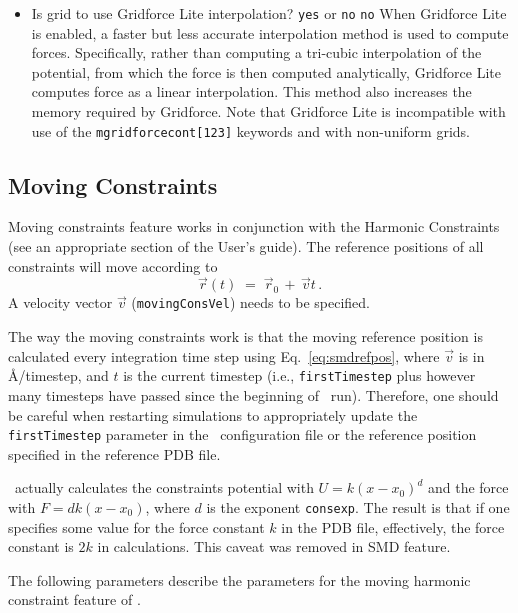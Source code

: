 \begin{itemize}
\item
{}
{Is grid to use Gridforce Lite interpolation?}
{{\tt yes} or {\tt no}}
{{\tt no}}
{When Gridforce Lite is enabled, a faster but less accurate interpolation method is used to compute forces.
Specifically, rather than computing a tri-cubic interpolation of the potential, from which the force is then computed analytically, Gridforce Lite computes force as a linear interpolation.
This method also increases the memory required by Gridforce.
Note that Gridforce Lite is incompatible with use of the {\tt mgridforcecont[123]} keywords and with non-uniform grids.
}

\end{itemize}

\subsection{Moving Constraints}

Moving constraints feature works in conjunction with the Harmonic
Constraints (see an appropriate section of the User's guide).
The reference positions of all constraints
will move according to
\begin{equation}
\label{eq:smdrefpos}
   \vec r(t) \; = \; \vec r_0 \, + \, \vec v t \,.
\end{equation}
A velocity vector $\vec v$ ({\tt movingConsVel}) needs to be specified.

The way the moving constraints work is that the moving reference
position is calculated every integration time step using
Eq.~\ref{eq:smdrefpos}, where $\vec v$ is in \AA/timestep, and $t$ is the
current timestep (i.e., {\tt firstTimestep} plus however many
timesteps have passed since the beginning of \NAMD\ run). Therefore,
one should be careful when restarting simulations to appropriately
update the {\tt firstTimestep} parameter in the \NAMD\ configuration
file or the reference position specified in the reference PDB file.

 \NAMD\ actually calculates the constraints
potential with $U = k (x-x_0)^d$ and the force with $F = d k (x-x_0)$,
where $d$ is the exponent {\tt consexp}. The result is that if one
specifies some value for the force constant $k$ in the PDB file,
effectively, the force constant is $2 k$ in calculations. This caveat
was removed in SMD feature.

The following parameters describe the parameters for the
moving harmonic constraint feature of \NAMD.

